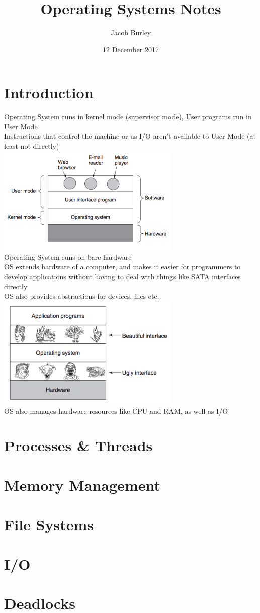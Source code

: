 \documentclass{article}
\title{Operating Systems Notes}
\author{Jacob Burley} %
\date{12 December 2017}
\begin{document}
\maketitle
\section{Introduction}
Operating System runs in kernel mode (supervisor mode), User programs run in User Mode
\\Instructions that control the machine or us I/O aren't available to User Mode (at least not directly)
\\\includegraphics[width= 250pt]{tex/ch1/1-1.png}
\\Operating System runs on bare hardware
\\OS extends hardware of a computer, and makes it easier for programmers to develop applications without having to deal with things like SATA interfaces directly
\\OS also provides abstractions for devices, files etc.
\\\includegraphics[width = 250pt]{tex/ch1/1-2.png}
\\OS also manages hardware resources like CPU and RAM, as well as I/O
\section{Processes & Threads}

\section{Memory Management}

\section{File Systems}

\section{I/O}

\section{Deadlocks}
\end{document}
